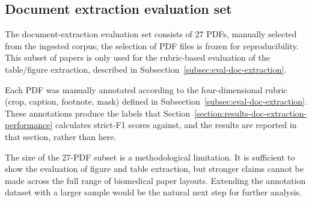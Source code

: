 \subsection{Document extraction evaluation set}\label{subsec:doc-extraction-eval-set}

The document-extraction evaluation set consists of 27 PDFs, manually selected from the ingested corpus; the selection of PDF files is frozen for reproducibility. This subset of papers is only used for the rubric-based evaluation of the table/figure extraction, described in Subsection~\ref{subsec:eval-doc-extraction}.

Each PDF was manually annotated according to the four-dimensional rubric (crop, caption, footnote, mask) defined in Subsection~\ref{subsec:eval-doc-extraction}. These annotations produce the labels that Section~\ref{section:results-doc-extraction-performance} calculates strict-F1 scores against, and the results are reported in that section, rather than here.

The size of the 27-PDF subset is a methodological limitation. It is sufficient to show the evaluation of figure and table extraction, but stronger claims cannot be made across the full range of biomedical paper layouts. Extending the annotation dataset with a larger sample would be the natural next step for further analysis.